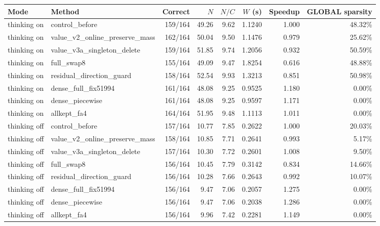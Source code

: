 \begin{tabular}{llrrrrrr}
\toprule
Mode & Method & Correct & $N$ & $N/C$ & $W$ (s) & Speedup & GLOBAL sparsity \\
\midrule
thinking on & control\_before & 159/164 & 49.26 & 9.62 & 1.1240 & 1.000 & 48.32\% \\
thinking on & value\_v2\_online\_preserve\_mass & 162/164 & 50.04 & 9.50 & 1.1476 & 0.979 & 25.62\% \\
thinking on & value\_v3a\_singleton\_delete & 159/164 & 51.85 & 9.74 & 1.2056 & 0.932 & 50.59\% \\
thinking on & full\_swap8 & 155/164 & 49.09 & 9.47 & 1.8254 & 0.616 & 48.88\% \\
thinking on & residual\_direction\_guard & 158/164 & 52.54 & 9.93 & 1.3213 & 0.851 & 50.98\% \\
thinking on & dense\_full\_fix51994 & 161/164 & 48.08 & 9.25 & 0.9525 & 1.180 & 0.00\% \\
thinking on & dense\_piecewise & 161/164 & 48.08 & 9.25 & 0.9597 & 1.171 & 0.00\% \\
thinking on & allkept\_fa4 & 164/164 & 51.95 & 9.48 & 1.1113 & 1.011 & 0.00\% \\
thinking off & control\_before & 157/164 & 10.77 & 7.85 & 0.2622 & 1.000 & 20.03\% \\
thinking off & value\_v2\_online\_preserve\_mass & 158/164 & 10.85 & 7.71 & 0.2641 & 0.993 & 5.17\% \\
thinking off & value\_v3a\_singleton\_delete & 157/164 & 10.30 & 7.72 & 0.2601 & 1.008 & 9.50\% \\
thinking off & full\_swap8 & 156/164 & 10.45 & 7.79 & 0.3142 & 0.834 & 14.66\% \\
thinking off & residual\_direction\_guard & 156/164 & 10.28 & 7.66 & 0.2643 & 0.992 & 10.07\% \\
thinking off & dense\_full\_fix51994 & 156/164 & 9.47 & 7.06 & 0.2057 & 1.275 & 0.00\% \\
thinking off & dense\_piecewise & 156/164 & 9.47 & 7.06 & 0.2038 & 1.286 & 0.00\% \\
thinking off & allkept\_fa4 & 156/164 & 9.96 & 7.42 & 0.2281 & 1.149 & 0.00\% \\
\bottomrule
\end{tabular}
